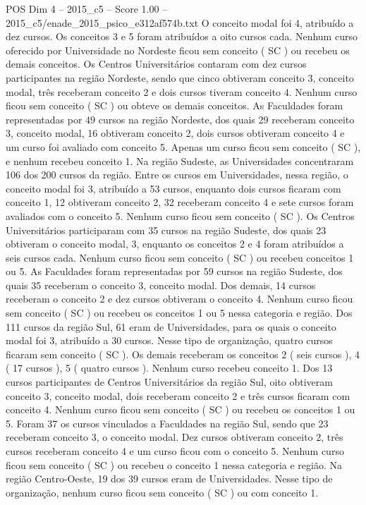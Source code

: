 \begin{textsample}{POS Dim 4 – 2015\_c5 – Score 1.00 – 2015\_c5/enade\_2015\_psico\_e312af574b.txt}
O conceito modal foi 4, atribuído a dez cursos.
Os conceitos 3 e 5 foram atribuídos a oito cursos cada.
Nenhum curso oferecido por Universidade no Nordeste ficou sem conceito ( SC ) ou recebeu os demais conceitos.
Os Centros Universitários contaram com dez cursos participantes na região Nordeste, sendo que cinco obtiveram conceito 3, conceito modal, três receberam conceito 2 e dois cursos tiveram conceito 4.
Nenhum curso ficou sem conceito ( SC ) ou obteve os demais conceitos.
As Faculdades foram representadas por 49 cursos na região Nordeste, dos quais 29 receberam conceito 3, conceito modal, 16 obtiveram conceito 2, dois cursos obtiveram conceito 4 e um curso foi avaliado com conceito 5.
Apenas um curso ficou sem conceito ( SC ), e nenhum recebeu conceito 1.
Na região Sudeste, as Universidades concentraram 106 dos 200 cursos da região.
Entre os cursos em Universidades, nessa região, o conceito modal foi 3, atribuído a 53 cursos, enquanto dois cursos ficaram com conceito 1, 12 obtiveram conceito 2, 32 receberam conceito 4 e sete cursos foram avaliados com o conceito 5.
Nenhum curso ficou sem conceito ( SC ).
Os Centros Universitários participaram com 35 cursos na região Sudeste, dos quais 23 obtiveram o conceito modal, 3, enquanto os conceitos 2 e 4 foram atribuídos a seis cursos cada.
Nenhum curso ficou sem conceito ( SC ) ou recebeu conceitos 1 ou 5.
As Faculdades foram representadas por 59 cursos na região Sudeste, dos quais 35 receberam o conceito 3, conceito modal.
Dos demais, 14 cursos receberam o conceito 2 e dez cursos obtiveram o conceito 4.
Nenhum curso ficou sem conceito ( SC ) ou recebeu os conceitos 1 ou 5 nessa categoria e região.
Dos 111 cursos da região Sul, 61 eram de Universidades, para os quais o conceito modal foi 3, atribuído a 30 cursos.
Nesse tipo de organização, quatro cursos ficaram sem conceito ( SC ).
Os demais receberam os conceitos 2 ( seis cursos ), 4 ( 17 cursos ), 5 ( quatro cursos ).
Nenhum curso recebeu conceito 1.
Dos 13 cursos participantes de Centros Universitários da região Sul, oito obtiveram conceito 3, conceito modal, dois receberam conceito 2 e três cursos ficaram com conceito 4.
Nenhum curso ficou sem conceito ( SC ) ou recebeu os conceitos 1 ou 5.
Foram 37 os cursos vinculados a Faculdades na região Sul, sendo que 23 receberam conceito 3, o conceito modal.
Dez cursos obtiveram conceito 2, três cursos receberam conceito 4 e um curso ficou com o conceito 5.
Nenhum curso ficou sem conceito ( SC ) ou recebeu o conceito 1 nessa categoria e região.
Na região Centro-Oeste, 19 dos 39 cursos eram de Universidades.
Nesse tipo de organização, nenhum curso ficou sem conceito ( SC ) ou com conceito 1.

\end{textsample}
